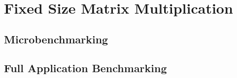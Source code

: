 \section{Fixed Size Matrix Multiplication}
\subsection{Microbenchmarking}
\subsection{Full Application Benchmarking}
